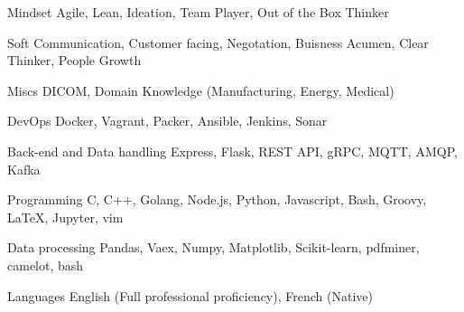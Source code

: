 

\begin{cvskills}
  \cvskill
  {Mindset} %
  {Agile, Lean, Ideation, Team Player, Out of the Box Thinker} %

  \cvskill
  {Soft} %
  {Communication, Customer facing, Negotation, Buisness Acumen, Clear Thinker, People Growth} %

  \cvskill
  {Miscs} %
  {DICOM, Domain Knowledge (Manufacturing, Energy, Medical)} %

  \cvskill
    {DevOps} %
    {Docker, Vagrant, Packer, Ansible, Jenkins, Sonar} %

  \cvskill
    {Back-end and Data handling} %
    {Express, Flask, REST API, gRPC, MQTT, AMQP, Kafka} %


  \cvskill
    {Programming} %
    {C, C++, Golang, Node.js, Python, Javascript, Bash, Groovy, LaTeX, Jupyter, vim} %

  \cvskill
    {Data processing} %
    {Pandas, Vaex, Numpy, Matplotlib, Scikit-learn, pdfminer, camelot, bash}  %

  \cvskill
    {Languages} %
    {English (Full professional proficiency), French (Native)} %

\end{cvskills}
